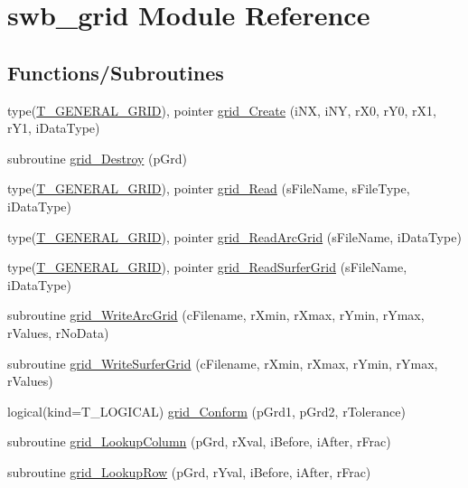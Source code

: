 \hypertarget{namespaceswb__grid}{
\section{swb\_\-grid Module Reference}
\label{namespaceswb__grid}
}
\subsection*{Functions/Subroutines}
\begin{DoxyCompactItemize}
\item 
type(\hyperlink{typetypes_1_1_t___g_e_n_e_r_a_l___g_r_i_d}{T\_\-GENERAL\_\-GRID}), pointer \hyperlink{namespaceswb__grid_a961bb54be48e77d8d35cb822379f4e60}{grid\_\-Create} (iNX, iNY, rX0, rY0, rX1, rY1, iDataType)
\item 
subroutine \hyperlink{namespaceswb__grid_a42bbda135d21221339b4b6656da28933}{grid\_\-Destroy} (pGrd)
\item 
type(\hyperlink{typetypes_1_1_t___g_e_n_e_r_a_l___g_r_i_d}{T\_\-GENERAL\_\-GRID}), pointer \hyperlink{namespaceswb__grid_a99ec16225afef63a0e34f4882ee3250f}{grid\_\-Read} (sFileName, sFileType, iDataType)
\item 
type(\hyperlink{typetypes_1_1_t___g_e_n_e_r_a_l___g_r_i_d}{T\_\-GENERAL\_\-GRID}), pointer \hyperlink{namespaceswb__grid_a3a3408da7876ea041fba69415cbbab94}{grid\_\-ReadArcGrid} (sFileName, iDataType)
\item 
type(\hyperlink{typetypes_1_1_t___g_e_n_e_r_a_l___g_r_i_d}{T\_\-GENERAL\_\-GRID}), pointer \hyperlink{namespaceswb__grid_aa0df2bc020bca54470db5468f6a026a0}{grid\_\-ReadSurferGrid} (sFileName, iDataType)
\item 
subroutine \hyperlink{namespaceswb__grid_a9d60759cd038c3d1936d912299e2f4a2}{grid\_\-WriteArcGrid} (cFilename, rXmin, rXmax, rYmin, rYmax, rValues, rNoData)
\item 
subroutine \hyperlink{namespaceswb__grid_aaf1f4ad8065d88804760ea3d28fb2e02}{grid\_\-WriteSurferGrid} (cFilename, rXmin, rXmax, rYmin, rYmax, rValues)
\item 
logical(kind=T\_\-LOGICAL) \hyperlink{namespaceswb__grid_ada2d0ba491d29a4a52aae2822b888f1f}{grid\_\-Conform} (pGrd1, pGrd2, rTolerance)
\item 
subroutine \hyperlink{namespaceswb__grid_ab16578a0a4a5254a39601c1051e486d2}{grid\_\-LookupColumn} (pGrd, rXval, iBefore, iAfter, rFrac)
\item 
subroutine \hyperlink{namespaceswb__grid_a20f18afc3ec94624f31f66f3641a73a8}{grid\_\-LookupRow} (pGrd, rYval, iBefore, iAfter, rFrac)

\end{DoxyCompactItemize}
